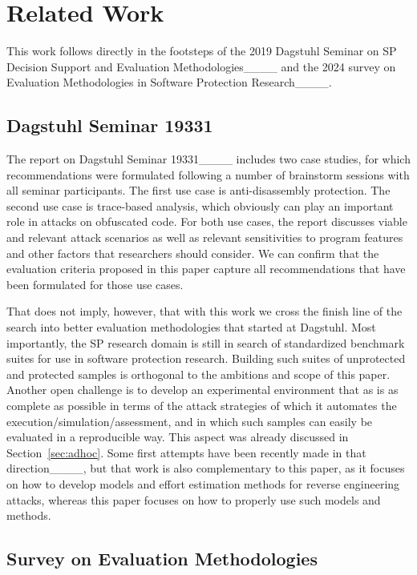 \section{Related Work}
This work follows directly in the footsteps of the 2019 Dagstuhl Seminar on SP Decision Support and Evaluation Methodologies____ and the 2024 survey on Evaluation Methodologies in Software Protection Research____.

\subsection{Dagstuhl Seminar 19331}
The report on Dagstuhl Seminar 19331____ includes two case studies, for which recommendations were formulated following a number of brainstorm sessions with all seminar participants. The first use case is anti-disassembly protection. The second use case is trace-based analysis, which obviously can play an important role in attacks on obfuscated code. For both use cases, the report discusses viable and relevant attack scenarios as well as relevant sensitivities to program features and other factors that researchers should consider. We can confirm that the evaluation criteria proposed in this paper capture all recommendations that have been formulated for those use cases. 

That does not imply, however, that with this work we cross the finish line of the search into better evaluation methodologies that started at Dagstuhl. Most importantly, the SP research domain is still in search of standardized benchmark suites for use in software protection research. Building such suites of unprotected and protected samples is orthogonal to the ambitions and scope of this paper. Another open challenge is to develop an experimental environment that as is as complete as possible in terms of the attack strategies of which it automates the execution/simulation/assessment, and in which such samples can easily be evaluated in a reproducible way. This aspect was already discussed in Section~\ref{sec:adhoc}. Some first attempts have been recently made in that direction____, but that work is also complementary to this paper, as it focuses on how to develop models and effort estimation methods for reverse engineering attacks, whereas this paper focuses on how to properly use such models and methods.  

\subsection{Survey on Evaluation Methodologies}

